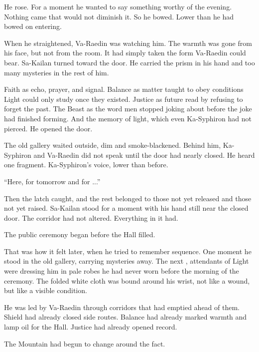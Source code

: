He rose.
For a moment he wanted to say something worthy of the evening.
Nothing came that would not diminish it.
So he bowed.
Lower than he had bowed on entering.\par

When he straightened, Va-Raedin was watching him.
The warmth was gone from his face, but not from the room.
It had simply taken the form Va-Raedin could bear.
Sa-Kailan turned toward the door.
He carried the prism in his hand and too many mysteries in the rest of him.\par

Faith as echo, prayer, and signal.
Balance as matter taught to obey conditions Light could only study once they existed.
Justice as future read by refusing to forget the past.
The Beast as the word men stopped joking about before the joke had finished forming.
And the memory of light, which even Ka-Syphiron had not pierced.
He opened the door.\par

The old gallery waited outside, dim and smoke-blackened.
Behind him, Ka-Syphiron and Va-Raedin did not speak until the door had nearly closed.
He heard one fragment.
Ka-Syphiron’s voice, lower than before.\par

“Here, for tomorrow and for ...”\par

Then the latch caught, and the rest belonged to those not yet released and those not yet raised.
Sa-Kailan stood for a moment with his hand still near the closed door.
The corridor had not altered.
Everything in it had.\par

The public ceremony began before the Hall filled.\par

That was how it felt later, when he tried to remember sequence.
One moment he stood in the old gallery, carrying mysteries away.
The next , attendants of Light were dressing him in pale robes he had never worn before the morning of the ceremony.
The folded white cloth was bound around his wrist, not like a wound, but like a visible condition.\par

He was led by Va-Raedin through corridors that had emptied ahead of them.
Shield had already closed side routes.
Balance had already marked warmth and lamp oil for the Hall.
Justice had already opened record.\par

The Mountain had begun to change around the fact.\par

\ornament
